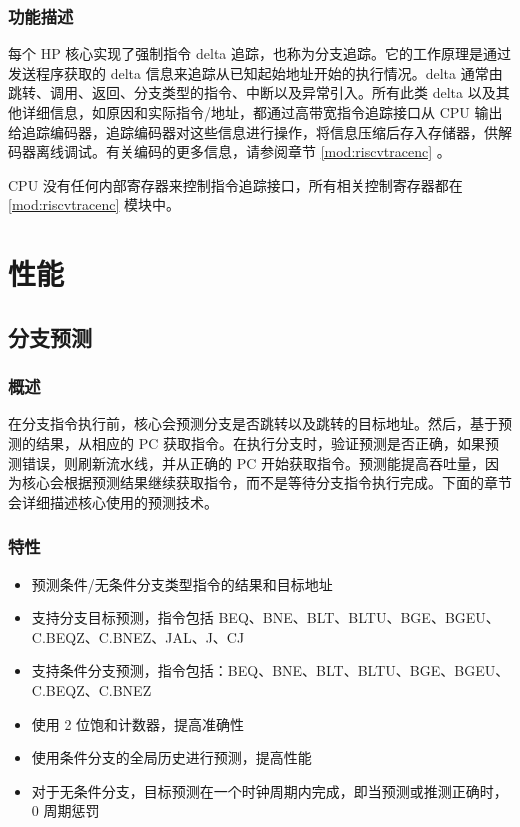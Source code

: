 \documentclass[main\_\_CN.tex]{subfiles}
\begin{document}
\subsubsection{功能描述}
\label{sec:riscvcpu-trace-func-descr}

每个 HP 核心实现了强制指令 delta 追踪，也称为分支追踪。它的工作原理是通过发送程序获取的 delta 信息来追踪从已知起始地址开始的执行情况。delta 通常由跳转、调用、返回、分支类型的指令、中断以及异常引入。所有此类 delta 以及其他详细信息，如原因和实际指令/地址，都通过高带宽指令追踪接口从 CPU 输出给追踪编码器，追踪编码器对这些信息进行操作，将信息压缩后存入存储器，供解码器离线调试。有关编码的更多信息，请参阅章节 \ref{mod:riscvtracenc} \textit{}。

CPU 没有任何内部寄存器来控制指令追踪接口，所有相关控制寄存器都在 \ref{mod:riscvtracenc} \textit{} 模块中。

\newpage
\section{性能}
\label{sec:riscvcpu-perf-enhancements}


\subsection{分支预测}
\label{sec:riscvcpu-perf-bp}

\subsubsection{概述}
\label{sec:riscvcpu-perf-bp-overview}
在分支指令执行前，核心会预测分支是否跳转以及跳转的目标地址。然后，基于预测的结果，从相应的 PC 获取指令。在执行分支时，验证预测是否正确，如果预测错误，则刷新流水线，并从正确的 PC 开始获取指令。预测能提高吞吐量，因为核心会根据预测结果继续获取指令，而不是等待分支指令执行完成。下面的章节会详细描述核心使用的预测技术。

\subsubsection{特性}
\label{sec:riscvcpu-perf-bp-features}
\begin{itemize}
    \item 预测条件/无条件分支类型指令的结果和目标地址
    \item 支持分支目标预测，指令包括 BEQ、BNE、BLT、BLTU、BGE、BGEU、C.BEQZ、C.BNEZ、JAL、J、CJ
    \item 支持条件分支预测，指令包括：BEQ、BNE、BLT、BLTU、BGE、BGEU、C.BEQZ、C.BNEZ
    \item 使用 2 位饱和计数器，提高准确性
    \item 使用条件分支的全局历史进行预测，提高性能
    \item 对于无条件分支，目标预测在一个时钟周期内完成，即当预测或推测正确时，0 周期惩罚
\end{itemize}
\end{document}
